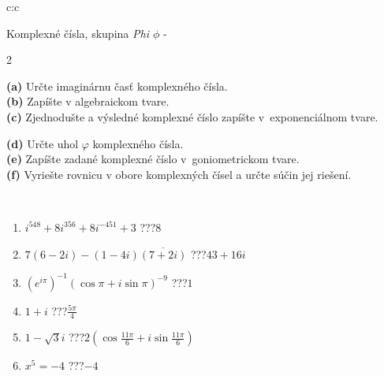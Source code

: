 \documentclass[10pt]{report}
\begin{document}
\begin{tabular}{c:c}
\begin{minipage}[c][104.5mm][t]{0.5\linewidth}
\begin{center}
\vspace{7mm}
{\huge Komplexné čísla, skupina \textit{Phi $\phi$} -}\\[5mm]
\begin{minipage}{0.95\linewidth}
\begin{center}
{\small \begin{multicols}{2} \raggedright
\textbf{(a)} Určte imaginárnu časť komplexného čísla. \\[1mm]
\textbf{(b)} Zapíšte v algebraickom tvare. \\[1mm]
\textbf{(c)} Zjednodušte a výsledné komplexné číslo zapíšte v~exponenciálnom tvare. \par \columnbreak
\textbf{(d)} Určte uhol \(\varphi\) komplexného čísla. \\[1mm]
\textbf{(e)} Zapíšte zadané komplexné číslo v~goniometrickom tvare. \\[1mm]
\textbf{(f)} Vyriešte rovnicu v obore komplexných čísel a určte súčin jej riešení.
\end{multicols}
}
\end{center}
\end{minipage}
\\[4mm]
\begin{minipage}{0.79\linewidth}
\begin{center}
\begin{varwidth}{\linewidth}
\begin{enumerate}
\large
\item $i^{548}+8i^{356}+8i^{-451}+3$\quad \dotfill\; ???\;\dotfill \quad $8$
\item $7(6-2i)-(1-4i)\overline{(7+2i)}$\quad \dotfill\; ???\;\dotfill \quad $43+16i$
\item $\left(e^{i\pi}\right)^{-1}\left(\cos{\pi}+i\sin{\pi}\right)^{-9}$\quad \dotfill\; ???\;\dotfill \quad $1$
\item $1+i$\quad \dotfill\; ???\;\dotfill \quad $\frac{5\pi}{4}$
\item $1-\sqrt{3}i$\quad \dotfill\; ???\;\dotfill \quad $2\left(\cos{\frac{11\pi}{6}}+i\sin{\frac{11\pi}{6}}\right)$
\item $x^5=-4$\quad \dotfill\; ???\;\dotfill \quad $-4$
\end{enumerate}
\end{varwidth}
\end{center}

\end{minipage}
\end{center}
\end{minipage}
\end{tabular}
\end{document}
